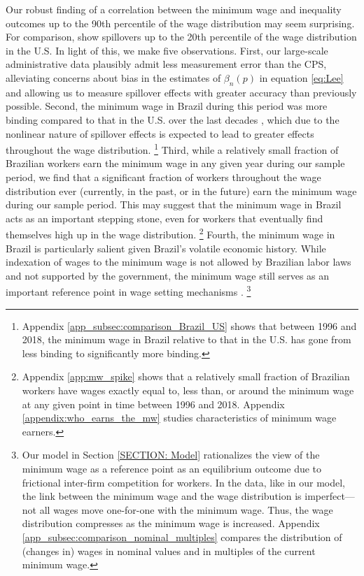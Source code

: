Our robust finding of a correlation between the minimum wage and inequality outcomes up to the 90th percentile of the wage distribution may seem surprising. For comparison, \citet{Autor2016} show spillovers up to the 20th percentile of the wage distribution in the U.S. In light of this, we make five observations. First, our large-scale administrative data plausibly admit less measurement error than the CPS, alleviating concerns about bias in the estimates of $\beta_{n}(p)$ in equation \eqref{eq:Lee} and allowing us to measure spillover effects with greater accuracy than previously possible. %
Second, the minimum wage in Brazil during this period was more binding compared to that in the U.S. over the last decades \citep{Autor2016}, which due to the nonlinear nature of spillover effects is expected to lead to greater effects throughout the wage distribution.%
%
\footnote{Appendix \ref{app_subsec:comparison_Brazil_US} shows that between 1996 and 2018, the minimum wage in Brazil relative to that in the U.S. has gone from less binding to significantly more binding.} %
%
Third, while a relatively small fraction of Brazilian workers earn the minimum wage in any given year during our sample period, we find that a significant fraction of workers throughout the wage distribution ever (currently, in the past, or in the future) earn the minimum wage during our sample period. This may suggest that the minimum wage in Brazil acts as an important stepping stone, even for workers that eventually find themselves high up in the wage distribution.%
%
\footnote{Appendix \ref{app:mw_spike} shows that a relatively small fraction of Brazilian workers have wages exactly equal to, less than, or around the minimum wage at any given point in time between 1996 and 2018. Appendix \ref{appendix:who_earns_the_mw} studies characteristics of minimum wage earners.} %
%
Fourth, the minimum wage in Brazil is particularly salient given Brazil's volatile economic history. While indexation of wages to the minimum wage is not allowed by Brazilian labor laws and not supported by the government, the minimum wage still serves as an important reference point in wage setting mechanisms \citep{NeriMoura2006}.%
%
\footnote{Our model in Section \ref{SECTION: Model} rationalizes the view of the minimum wage as a reference point as an equilibrium outcome due to frictional inter-firm competition for workers. In the data, like in our model, the link between the minimum wage and the wage distribution is imperfect---not all wages move one-for-one with the minimum wage. Thus, the wage distribution compresses as the minimum wage is increased. Appendix \ref{app_subsec:comparison_nominal_multiples} compares the distribution of (changes in) wages in nominal values and in multiples of the current minimum wage.} %
